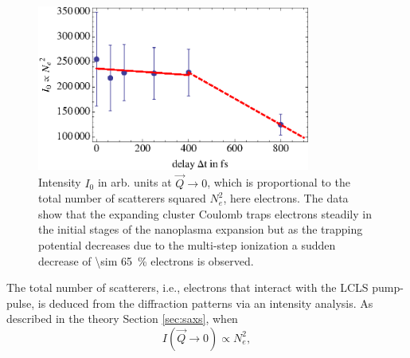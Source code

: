 \begin{figure}
	\centering
		\includegraphics[width=0.80\textwidth]{images/results/number-of-scatterer.eps}
	\caption[Time-resolved behavior of number of scatterers due to nanoplasma expansion]{Intensity $I_{0}$ in arb. units at $\vec{Q}\rightarrow 0$, which is proportional to the total number of scatterers squared $N_{e}^{2}$, here electrons. The data show that the expanding cluster Coulomb traps electrons steadily in the initial stages of the nanoplasma expansion but as the trapping potential decreases due to the multi-step ionization a sudden decrease of \SI{\sim 65}{\percent} electrons is observed.}
	\label{fig:number-of-scatterer}
\end{figure}
The total number of scatterers, i.e., electrons that interact with the LCLS pump-pulse, is deduced from the diffraction patterns via an intensity analysis. As described in the theory Section \ref{sec:saxs}, when
\begin{equation}
I\left(\vec{Q}\rightarrow 0\right) \propto N_{e}^{2},
\label{eq:}
\end{equation}
